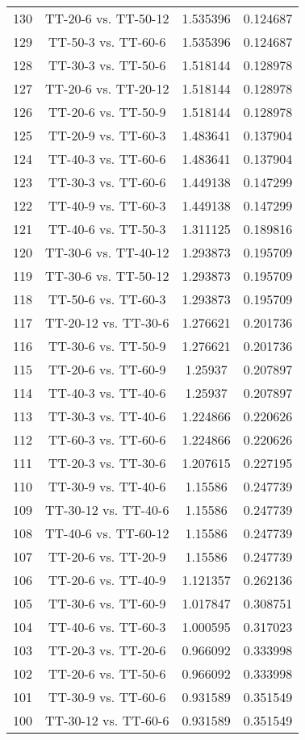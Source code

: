 \documentclass[a4paper,10pt]{article}
\begin{document}
\begin{landscape}
\begin{table}[!htp]
\begin{tabular}{cccc}
130&TT-20-6 vs. TT-50-12&1.535396&0.124687\\
129&TT-50-3 vs. TT-60-6&1.535396&0.124687\\
128&TT-30-3 vs. TT-50-6&1.518144&0.128978\\
127&TT-20-6 vs. TT-20-12&1.518144&0.128978\\
126&TT-20-6 vs. TT-50-9&1.518144&0.128978\\
125&TT-20-9 vs. TT-60-3&1.483641&0.137904\\
124&TT-40-3 vs. TT-60-6&1.483641&0.137904\\
123&TT-30-3 vs. TT-60-6&1.449138&0.147299\\
122&TT-40-9 vs. TT-60-3&1.449138&0.147299\\
121&TT-40-6 vs. TT-50-3&1.311125&0.189816\\
120&TT-30-6 vs. TT-40-12&1.293873&0.195709\\
119&TT-30-6 vs. TT-50-12&1.293873&0.195709\\
118&TT-50-6 vs. TT-60-3&1.293873&0.195709\\
117&TT-20-12 vs. TT-30-6&1.276621&0.201736\\
116&TT-30-6 vs. TT-50-9&1.276621&0.201736\\
115&TT-20-6 vs. TT-60-9&1.25937&0.207897\\
114&TT-40-3 vs. TT-40-6&1.25937&0.207897\\
113&TT-30-3 vs. TT-40-6&1.224866&0.220626\\
112&TT-60-3 vs. TT-60-6&1.224866&0.220626\\
111&TT-20-3 vs. TT-30-6&1.207615&0.227195\\
110&TT-30-9 vs. TT-40-6&1.15586&0.247739\\
109&TT-30-12 vs. TT-40-6&1.15586&0.247739\\
108&TT-40-6 vs. TT-60-12&1.15586&0.247739\\
107&TT-20-6 vs. TT-20-9&1.15586&0.247739\\
106&TT-20-6 vs. TT-40-9&1.121357&0.262136\\
105&TT-30-6 vs. TT-60-9&1.017847&0.308751\\
104&TT-40-6 vs. TT-60-3&1.000595&0.317023\\
103&TT-20-3 vs. TT-20-6&0.966092&0.333998\\
102&TT-20-6 vs. TT-50-6&0.966092&0.333998\\
101&TT-30-9 vs. TT-60-6&0.931589&0.351549\\
100&TT-30-12 vs. TT-60-6&0.931589&0.351549\\

\end{tabular}
\end{table}
\end{landscape}
\end{document}

